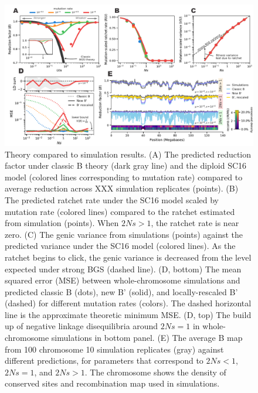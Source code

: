 \documentclass[11pt]{article}
\begin{document}
\begin{figure}[htbp] \centering
    \includegraphics[width=\textwidth]{figures/figure_1.pdf} \caption{Theory
        compared to simulation results. (A) The predicted reduction factor
        under classic B theory (dark gray line) and the diploid SC16 model
        (colored lines corresponding to mutation rate) compared to average
        reduction across XXX simulation replicates (points). (B) The predicted
        ratchet rate under the SC16 model scaled by mutation rate (colored
        lines) compared to the ratchet estimated from simulation (points). When
        $2Ns>1$, the ratchet rate is near zero. (C) The genic variance from
        simulations (points) against the predicted variance under the SC16
        model (colored lines). As the ratchet begins to click, the genic
        variance is decreased from the level expected under strong BGS (dashed
        line). (D, bottom) The mean squared error (MSE) between
        whole-chromosome simulations and predicted classic B (dots), new B'
        (solid), and locally-rescaled B' (dashed) for different mutation rates
        (colors). The dashed horizontal line is the approximate theoretic
        minimum MSE. (D, top) The build up of negative linkage disequilibria
        around $2Ns=1$ in whole-chromosome simulations in bottom panel. (E) The
        average B map from 100 chromosome 10 simulation replicates (gray)
    against different predictions, for parameters that correspond to $2Ns < 1$,
$2Ns = 1$, and $2Ns > 1$. The chromosome shows the density of conserved sites
and recombination map used in simulations. }
  \label{fig:figure-1}
\end{figure}
\end{document}
